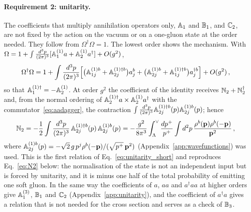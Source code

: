 \paragraph{Requirement 2: unitarity.} The coefficients that multiply annihilation operators only, $\mathbb{A}_1$ and $\mathbb{B}_1$, and $\mathbb{C}_2$, are not fixed by the action on the vacuum or on a one-gluon state at the order needed. They follow from $\Omega^\dagger\Omega=1$. The lowest order shows the mechanism. With $\Omega=1+\int\frac{d^3p}{(2\pi)^3}[\mathbb{A}^{(1)}_1a+\mathbb{A}^{(1)}_2a^\dagger]+O(g^2)$,
\begin{align}
\Omega^\dagger\Omega=1+\int\frac{d^3p}{(2\pi)^3}\Big[\big(\mathbb{A}^{(1)b}_{1j}+\mathbb{A}^{(1)\dagger b}_{2j}\big)a^b_j+\big(\mathbb{A}^{(1)b}_{2j}+\mathbb{A}^{(1)\dagger b}_{1j}\big)a^{\dagger b}_j\Big]+O(g^2)\,,
\end{align}
so that $\mathbb{A}^{(1)\dagger}_1=-\mathbb{A}^{(1)}_2$. At order $g^2$ the coefficient of the identity receives $\mathbb{N}_2+\mathbb{N}_2^\dagger$ and, from the normal ordering of $\mathbb{A}^{(1)\dagger}_2a\times\mathbb{A}^{(1)}_2a^\dagger$ with the commutator~\eqref{eq:aadagger}, the contraction $\int\frac{d^3p}{(2\pi)^3}\mathbb{A}^{(1)\dagger b}_{2j}(p)\mathbb{A}^{(1)b}_{2j}(p)$; hence
\begin{align}\label{eq:N2fromunit}
\mathbb{N}_2=-\frac12\int\frac{d^3p}{(2\pi)^3}\,\mathbb{A}^{(1)\dagger b}_{2j}(p)\,\mathbb{A}^{(1)b}_{2j}(p)
=-\frac{g^2}{8\pi^3}\int_\Lambda^\vee\frac{dp^+}{p^+}\int d^2p\,\frac{\rho^b(\mathbf{p})\rho^b(-\mathbf{p})}{\mathbf{p}^2}\,,
\end{align}
where $\mathbb{A}^{(1)b}_{2j}(p)=-\sqrt2\,g\,p^j\rho^b(-\mathbf{p})/(\sqrt{p^+}\,\mathbf{p}^2)$ (Appendix~\ref{app:wavefunctions}) was used. This is the first relation of Eq.~\eqref{eq:unitarity_short} and reproduces Eq.~\eqref{eq:N2} below: the normalisation of the state is not an independent input but is forced by unitarity, and it is minus one half of the total probability of emitting one soft gluon. In the same way the coefficients of $a$, $aa$ and $a^\dagger aa$ at higher orders give $\mathbb{A}^{(3)}_1$, $\mathbb{B}_1$ and $\mathbb{C}_2$ (Appendix~\ref{app:unitarity}), and the coefficient of $a^\dagger a$ gives a relation that is not needed for the cross section and serves as a check of $\mathbb{B}_3$.

